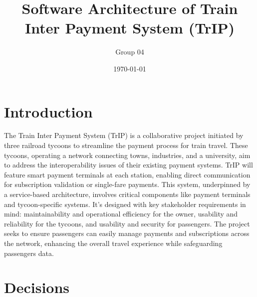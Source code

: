 \documentclass{article}
\title{Software Architecture of Train Inter Payment System (TrIP)}
\author{Group 04}
\date{\today}
\begin{document}
\maketitle
\newpage

\tableofcontents
\newpage

\section{Introduction}
The Train Inter Payment System (TrIP) is a collaborative project initiated by three railroad tycoons to streamline the payment process for train travel. These tycoons, operating a network connecting towns, industries, and a university, aim to address the interoperability issues of their existing payment systems. TrIP will feature smart payment terminals at each station, enabling direct communication for subscription validation or single-fare payments. This system, underpinned by a service-based architecture, involves critical components like payment terminals and tycoon-specific systems. It's designed with key stakeholder requirements in mind: maintainability and operational efficiency for the owner, usability and reliability for the tycoons, and usability and security for passengers. The project seeks to ensure passengers can easily manage payments and subscriptions across the network, enhancing the overall travel experience while safeguarding passengers data.
\newpage

\section{Decisions}

\newpage

\newpage

\newpage

\newpage

\newpage

\newpage

\newpage

\newpage

\newpage

\newpage

\newpage

\newpage

\newpage

\newpage







\appendix


% 


\end{document}
